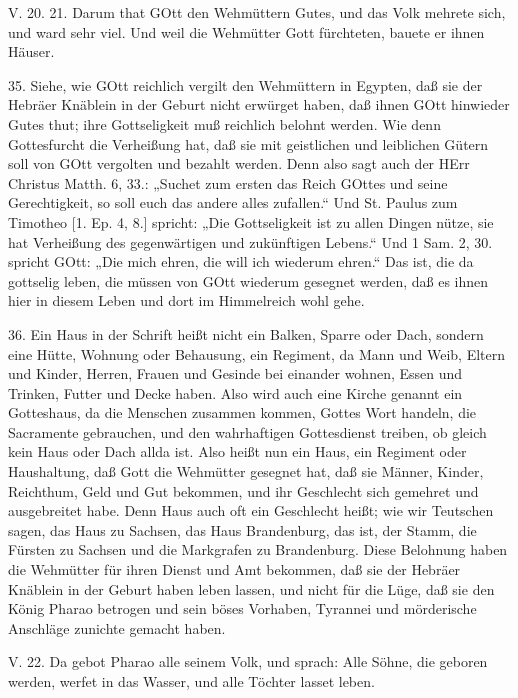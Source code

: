 \begin{schriftzitat}
V. 20. 21. Darum that GOtt den Wehmüttern Gutes, und das Volk mehrete sich, und ward sehr viel. Und weil die Wehmütter Gott fürchteten, bauete er ihnen Häuser.
\end{schriftzitat}

35. Siehe, wie GOtt reichlich vergilt den Wehmüttern in Egypten, daß sie der Hebräer Knäblein in der Geburt nicht erwürget haben, daß ihnen GOtt hinwieder Gutes thut; ihre Gottseligkeit muß reichlich belohnt werden. Wie denn Gottesfurcht die Verheißung hat, daß sie mit geistlichen und leiblichen Gütern soll von GOtt vergolten und bezahlt werden. Denn also sagt auch der HErr Christus Matth. 6, 33.: „Suchet zum ersten das Reich GOttes und seine Gerechtigkeit, so soll euch das andere alles zufallen.“ Und St. Paulus zum Timotheo [1. Ep. 4, 8.] spricht: „Die Gottseligkeit ist zu allen Dingen nütze, sie hat Verheißung des gegenwärtigen und zukünftigen Lebens.“ Und 1 Sam. 2, 30. spricht GOtt: „Die mich ehren, die will ich wiederum ehren.“ Das ist, die da gottselig leben, die müssen von GOtt wiederum gesegnet werden, daß es ihnen hier in diesem Leben und dort im Himmelreich wohl gehe.

36. Ein Haus in der Schrift heißt nicht ein Balken, Sparre oder Dach, sondern eine Hütte, Wohnung oder Behausung, ein Regiment, da Mann und Weib, Eltern und Kinder, Herren, Frauen und Gesinde bei einander wohnen, Essen und Trinken, Futter und Decke haben. Also wird auch eine Kirche genannt ein Gotteshaus, da die Menschen zusammen kommen, Gottes Wort handeln, die Sacramente gebrauchen, und den wahrhaftigen Gottesdienst treiben, ob gleich kein Haus oder Dach allda ist. Also heißt nun ein Haus, ein Regiment oder Haushaltung, daß Gott die Wehmütter gesegnet hat, daß sie Männer, Kinder, Reichthum, Geld und Gut bekommen, und ihr Geschlecht sich gemehret und ausgebreitet habe. Denn Haus auch oft ein Geschlecht heißt; wie wir Teutschen sagen, das Haus zu Sachsen, das Haus Brandenburg, das ist, der Stamm, die Fürsten zu Sachsen und die Markgrafen zu Brandenburg. Diese Belohnung haben die Wehmütter für ihren Dienst und Amt bekommen, daß sie der Hebräer Knäblein in der Geburt haben leben lassen, und nicht für die Lüge, daß sie den König Pharao betrogen und sein böses Vorhaben, Tyrannei und mörderische Anschläge zunichte gemacht haben.

\begin{schriftzitat}
V. 22. Da gebot Pharao alle seinem Volk, und sprach: Alle Söhne, die geboren werden, werfet in das Wasser, und alle Töchter lasset leben.
\end{schriftzitat}

